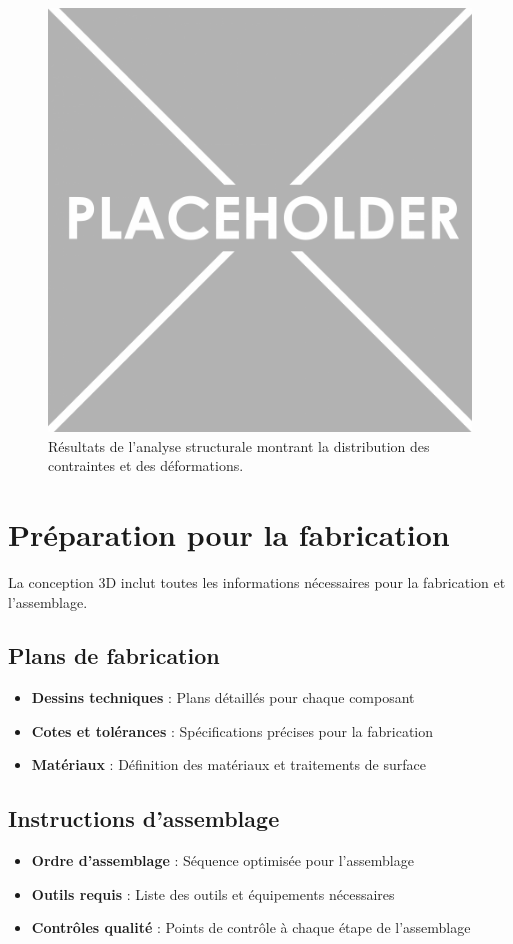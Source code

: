 {\begin{figure}[!htpb]
    \centering
    \includegraphics[width=0.7\linewidth]{Figures/PezizaTuberosa.jpg}
    \caption[Analyse structurale]{Résultats de l'analyse structurale montrant la distribution des contraintes et des déformations.}
    \label{fig:analyse-structurale}
\end{figure}

\section{Préparation pour la fabrication}
La conception 3D inclut toutes les informations nécessaires pour la fabrication et l'assemblage.

\subsection{Plans de fabrication}
\begin{itemize}
    \setlength{\itemsep}{.375em}
    \item \textbf{Dessins techniques} : Plans détaillés pour chaque composant
    \item \textbf{Cotes et tolérances} : Spécifications précises pour la fabrication
    \item \textbf{Matériaux} : Définition des matériaux et traitements de surface
\end{itemize}

\subsection{Instructions d'assemblage}
\begin{itemize}
    \setlength{\itemsep}{.375em}
    \item \textbf{Ordre d'assemblage} : Séquence optimisée pour l'assemblage
    \item \textbf{Outils requis} : Liste des outils et équipements nécessaires
    \item \textbf{Contrôles qualité} : Points de contrôle à chaque étape de l'assemblage
\end{itemize}

}
